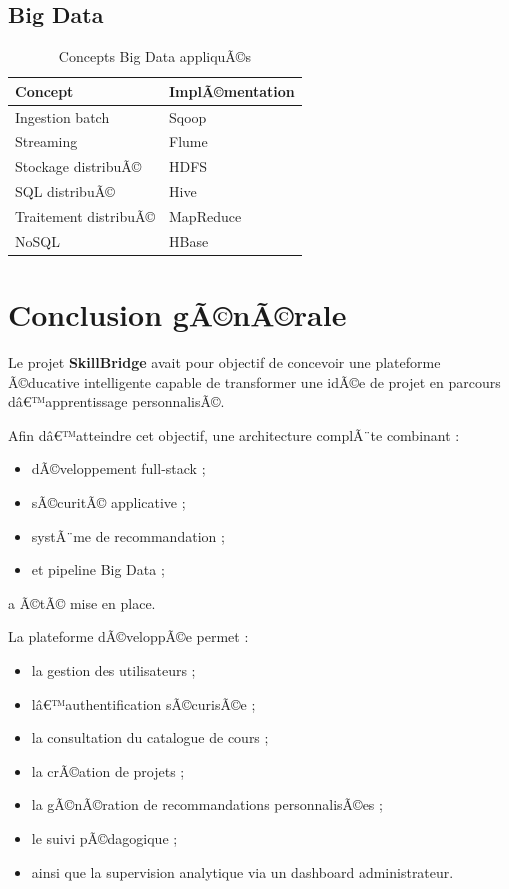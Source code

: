 ﻿\documentclass[12pt,a4paper]{report}
\begin{document}
\section{Big Data}

\begin{table}[H]
\centering
\caption{Concepts Big Data appliquÃ©s}
\begin{tabular}{|p{5cm}|p{8cm}|}
\hline
\textbf{Concept} & \textbf{ImplÃ©mentation} \\
\hline
Ingestion batch & Sqoop \\
\hline
Streaming & Flume \\
\hline
Stockage distribuÃ© & HDFS \\
\hline
SQL distribuÃ© & Hive \\
\hline
Traitement distribuÃ© & MapReduce \\
\hline
NoSQL & HBase \\
\hline
\end{tabular}
\end{table}

\chapter*{Conclusion gÃ©nÃ©rale}

Le projet \textbf{SkillBridge} avait pour objectif de concevoir une plateforme Ã©ducative intelligente capable de transformer une idÃ©e de projet en parcours dâ€™apprentissage personnalisÃ©.

Afin dâ€™atteindre cet objectif, une architecture complÃ¨te combinant :
\begin{itemize}
    \item dÃ©veloppement full-stack ;
    \item sÃ©curitÃ© applicative ;
    \item systÃ¨me de recommandation ;
    \item et pipeline Big Data ;
\end{itemize}
a Ã©tÃ© mise en place.

\vspace{0.5cm}

La plateforme dÃ©veloppÃ©e permet :
\begin{itemize}
    \item la gestion des utilisateurs ;
    \item lâ€™authentification sÃ©curisÃ©e ;
    \item la consultation du catalogue de cours ;
    \item la crÃ©ation de projets ;
    \item la gÃ©nÃ©ration de recommandations personnalisÃ©es ;
    \item le suivi pÃ©dagogique ;
    \item ainsi que la supervision analytique via un dashboard administrateur.
\end{itemize}
\end{document}

